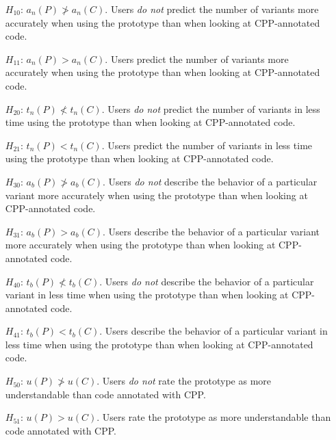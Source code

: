 \documentclass[11pt]{article}
\begin{document}
\begin{enumerate}[leftmargin=*,labelindent=\parindent]

\item[$H_{10}$:]
$a_n(P) \not> a_n(C)$.
Users \emph{do not} predict the number of variants more
accurately when using the prototype than when looking at CPP-annotated code.

\item[$H_{11}$:]
$a_n(P)     > a_n(C)$.
Users predict the number of variants more
accurately when using the prototype than when looking at CPP-annotated code.

\item[$H_{20}$:]
$t_n(P) \not< t_n(C)$.
Users \emph{do not} predict the number of variants in less
time using the prototype than when looking at CPP-annotated code.

\item[$H_{21}$:]
$t_n(P)     < t_n(C)$.
Users predict the number of variants in less
time using the prototype than when looking at CPP-annotated code.

\item[$H_{30}$:]
$a_b(P) \not> a_b(C)$.
Users \emph{do not} describe the behavior of a particular
variant more accurately when using the prototype than when looking at
CPP-annotated code.

\item[$H_{31}$:]
$a_b(P)     > a_b(C)$.
Users describe the behavior of a particular
variant more accurately when using the prototype than when looking at
CPP-annotated code.

\item[$H_{40}$:]
$t_b(P) \not< t_b(C)$.
Users \emph{do not} describe the behavior of a particular
variant in less time when using the prototype than when looking at
CPP-annotated code.

\item[$H_{41}$:]
$t_b(P)     < t_b(C)$.
Users describe the behavior of a particular
variant in less time when using the prototype than when looking at
CPP-annotated code.

\item[$H_{50}$:]
$u(P)   \not> u(C)  $.
Users \emph{do not} rate the prototype as more understandable
than code annotated with CPP.

\item[$H_{51}$:]
$u(P)       > u(C)  $.
Users rate the prototype as more understandable
than code annotated with CPP.

\end{enumerate}
\end{document}

